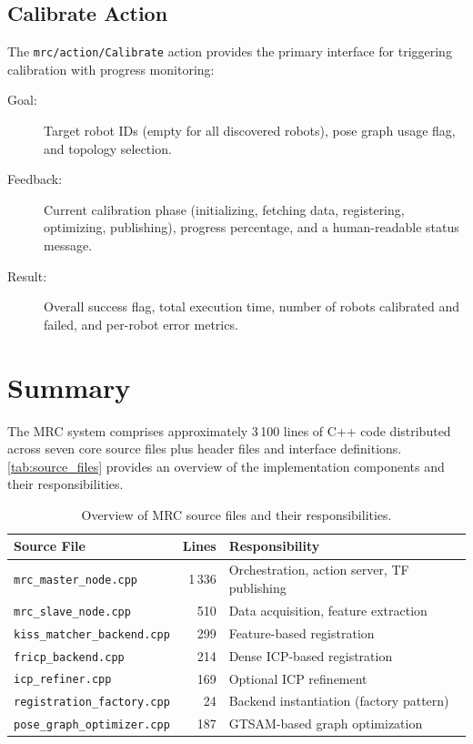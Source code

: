 \subsection{Calibrate Action}

The \texttt{mrc/action/Calibrate} action provides the primary interface for
triggering calibration with progress monitoring:

\begin{description}
    \item[Goal:] Target robot IDs (empty for all discovered robots),
                 pose graph usage flag, and topology selection.
    \item[Feedback:] Current calibration phase
                     (initializing, fetching data, registering, optimizing, publishing),
                     progress percentage, and a human-readable status message.
    \item[Result:] Overall success flag, total execution time, number of
                   robots calibrated and failed, and per-robot error metrics.
\end{description}

\section{Summary}

The MRC system comprises approximately 3\,100 lines of C++ code distributed
across seven core source files plus header files and interface definitions.
\autoref{tab:source_files} provides an overview of the implementation
components and their responsibilities.

\begin{table}[htbp]
    \centering
    \caption{Overview of MRC source files and their responsibilities.}
    \label{tab:source_files}
    \begin{tabular}{l r l}
        \toprule
        \textbf{Source File} & \textbf{Lines} & \textbf{Responsibility} \\
        \midrule
        \texttt{mrc\_master\_node.cpp}         & 1\,336 & Orchestration, action server, TF publishing \\
        \texttt{mrc\_slave\_node.cpp}           &    510 & Data acquisition, feature extraction \\
        \texttt{kiss\_matcher\_backend.cpp}     &    299 & Feature-based registration \\
        \texttt{fricp\_backend.cpp}             &    214 & Dense ICP-based registration \\
        \texttt{icp\_refiner.cpp}               &    169 & Optional ICP refinement \\
        \texttt{registration\_factory.cpp}      &     24 & Backend instantiation (factory pattern) \\
        \texttt{pose\_graph\_optimizer.cpp}     &    187 & GTSAM-based graph optimization \\
        \bottomrule
    \end{tabular}
\end{table}

